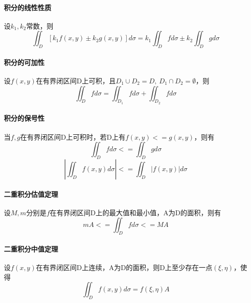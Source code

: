 \paragraph{积分的线性性质}
设\(k_1, k_2\)常数，则\[\iint_D[k_1f(x, y) \pm k_2g(x, y)]d\sigma = k_1\iint_Dfd\sigma \pm k_2\iint_Dgd\sigma\]

\paragraph{积分的可加性}
设\(f(x, y)\)在有界闭区间D上可积，且\(D_1\cup D_2 = D,\ D_1 \cap D_2 = \emptyset\)，则
\[\iint_Dfd\sigma = \iint_{D_1}fd\sigma + \iint_{D_2}fd\sigma\]

\paragraph{积分的保号性}
当\(f, g\)在有界闭区间D上可积时，若D上有\(f(x, y) <= g(x, y)\)，则有\[\iint_Dfd\sigma <= \iint_Dgd\sigma\]
\[|\iint_Df(x, y)d\sigma| <= \iint_D|f(x, y)|d\sigma\]

\paragraph{二重积分估值定理}
设\(M, m\)分别是\(f\)在有界闭区间D上的最大值和最小值，A为D的面积，则有
\[mA <= \iint_Dfd\sigma <= MA\]

\paragraph{二重积分中值定理}
设\(f(x, y)\)在有界闭区间D上连续，A为D的面积，则D上至少存在一点\((\xi, \eta)\)，使得
\[\iint_Df(x, y)d\sigma = f(\xi, \eta)A\]


